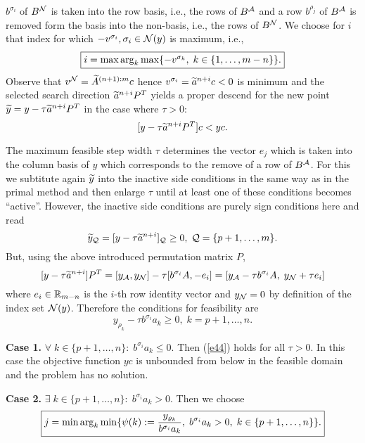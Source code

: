 $b^{\sigma _i}$ of $B^{{\cal N}}$ is taken into the row basis, i.e., the rows of
$B^{{\cal A}}$ and a row $b^{\rho _j}$ of $B^{{\cal A}}$ is removed form the basis into the
non-basis, i.e., the rows of $B^{{\cal N}}$.  We choose for $i$ that index for which
$-v^{\sigma _i}, \sigma _i \in {\cal N} (y)$ is maximum, i.e.,
\begin{equation}
\label{e42}
\fbox{$
i = \max \arg_k \max \{- v^{\sigma _k}, \; k \in \{ 1, \ldots, m - n\}\}.
$}
\end{equation}
%
Observe that $v^{{\cal N}} = \widetilde{A}^{(n+1):m}c$ hence $v^{\sigma _i} = \widetilde{a}^{n+i}c
< 0$ is minimum and the selected search direction $\widetilde{a}^{n+i}P^T$ yields a
proper descend for the new point $\widetilde{y} = y - \tau \widetilde{a}^{n+i}P^T$ in the
case where $\tau > 0$:
\[
[y - \tau \widetilde{a}^{n+i}P^T]c < yc.
\]
\par
The maximum feasible step width $\tau$ determines the vector $e_j$ which is
taken into the column basis of $y$ which corresponds to the remove of a row of
$B^{{\cal A}}$.  For this we subtitute again $\widetilde{y}$ into the inactive side
conditions in the same way as in the primal method and then enlarge $\tau$
until at least one of these conditions becomes ``active''.  However, the
inactive side conditions are purely sign conditions here and read
%
\[
\widetilde{y}_{{\cal Q}} = [y - \tau \widetilde{a}^{n+i}]_{{\cal Q}} \geq 0, \; {\cal Q} = \{p+1, \ldots, m\}.
\]
But, using the above introduced permutation matrix $P$,
\[
[y - \tau \widetilde{a}^{n+i}]P^T = [y_{{\cal A}}, y_{{\cal N}}] - \tau [b^{\sigma _i}A, -e_i]
= [y_{{\cal A}} - \tau b^{\sigma _i}A, \; y_{{\cal N}} + \tau e_i]
\]
where $e_i \in \Bbb{R}_{m-n}$ is the $i$-th row identity vector and $y_{{\cal N}} =
0$ by definition of the index set ${\cal N} (y)$. Therefore the conditions for
feasibility are
%
\begin{equation} \label{e44}
y_{\rho _k} - \tau b^{\sigma _i}a_k \geq 0, \; k = p+1, \ldots ,n.
\end{equation}
%
\par
{\bf Case 1.} $\forall \; k \in \{p+1, \ldots, n\}:  \; b^{\sigma _i}a_k \leq
0$.
Then (\ref{e44}) holds for all $\tau > 0$.  In this case the objective function
$yc$ is unbounded from below in the feasible domain and the problem has no
solution.
\par
{\bf Case 2.} $\exists \; k \in \{p+1, \ldots, n\}:  \; b^{\sigma _i}a_k >
0$. Then we choose
\begin{equation} \label{e45}
\fbox{$
\dis j = \min \arg_k \min \{\psi(k) := \frac{y_{\rho
_k}}
{b^{\sigma _i}a_k}, \;
%
b^{\sigma _i}a_k > 0, \;  k \in \{p+1, \ldots, n\}\}.
$}
\end{equation}
